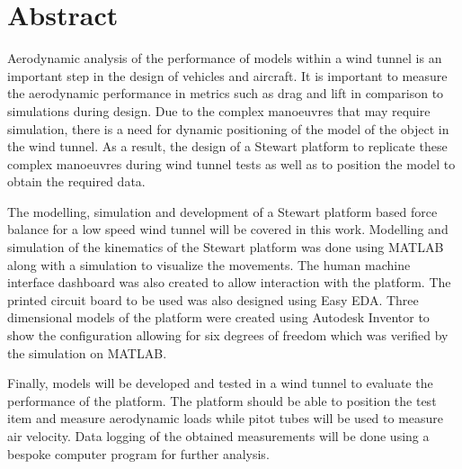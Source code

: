 
\section*{Abstract}
\label{sec:Abstract}
Aerodynamic analysis of the performance of models within a wind tunnel is an important step in the design of vehicles and aircraft. It is important to measure the aerodynamic performance in metrics such as drag and lift in comparison to simulations during design.
Due to the complex manoeuvres that may require simulation, there is a need for dynamic positioning of the model of the object in the wind tunnel. As a result, the design of a Stewart platform to replicate these complex manoeuvres during wind tunnel tests as well as to position the model to obtain the required data.

The modelling, simulation and development of a Stewart platform
based force balance for a low speed wind tunnel will be covered in this work. 
Modelling and simulation of the kinematics of the Stewart platform was done using MATLAB along with a simulation to visualize the movements. 
The human machine interface dashboard was also created to allow interaction with the platform. The printed circuit board to be used was also designed using Easy EDA. Three dimensional models of the platform were created using Autodesk Inventor to show the configuration allowing for six degrees of freedom which was verified by the simulation on MATLAB.

Finally, models will be developed and tested in a wind tunnel to evaluate the performance
of the platform. The platform should be able to position the test
item and measure aerodynamic loads while pitot tubes will be used to measure air velocity. Data logging of the obtained measurements will be done using a bespoke computer program for further analysis.


